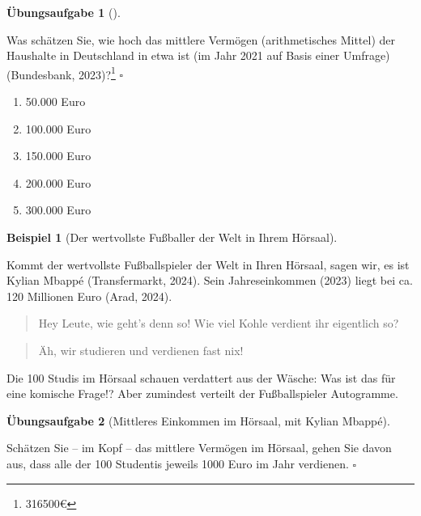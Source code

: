 \documentclass[
  letterpaper,
]{scrbook}
\providecommand{\tightlist}{%
  \setlength{\itemsep}{0pt}\setlength{\parskip}{0pt}}\usepackage{longtable,booktabs,array}
\theoremstyle{definition}
\newtheorem{exercise}{Übungsaufgabe}[chapter]
\theoremstyle{definition}
\newtheorem{example}{Beispiel}[chapter]
\theoremstyle{definition}
\theoremstyle{remark}
\begin{document}
\begin{exercise}[]\protect\hypertarget{exr-mw-wealth1}{}\label{exr-mw-wealth1}

Was schätzen Sie, wie hoch das mittlere Vermögen (arithmetisches Mittel)
der Haushalte in Deutschland in etwa ist (im Jahr 2021 auf Basis einer
Umfrage) (Bundesbank, 2023)?\footnote{316500€} \(\square\)

\begin{enumerate}
\def\labelenumi{\alph{enumi})}
\tightlist
\item
  50.000 Euro
\item
  100.000 Euro
\item
  150.000 Euro
\item
  200.000 Euro
\item
  300.000 Euro
\end{enumerate}

\end{exercise}

\begin{example}[Der wertvollste Fußballer der Welt in Ihrem
Hörsaal]\protect\hypertarget{exm-md}{}\label{exm-md}

Kommt der wertvollste Fußballspieler der Welt in Ihren Hörsaal, sagen
wir, es ist Kylian Mbappé (Transfermarkt, 2024). Sein Jahreseinkommen
(2023) liegt bei ca. 120 Millionen Euro (Arad, 2024).

\begin{quote}
{} Hey Leute, wie geht's denn so! Wie viel Kohle
verdient ihr eigentlich so?
\end{quote}

\begin{quote}
{} Äh, wir studieren und verdienen fast nix!
\end{quote}

Die 100 Studis im Hörsaal schauen verdattert aus der Wäsche: Was ist das
für eine komische Frage!? Aber zumindest verteilt der Fußballspieler
Autogramme.

\end{example}

\begin{exercise}[Mittleres Einkommen im Hörsaal, mit Kylian
Mbappé]\protect\hypertarget{exr-elon}{}\label{exr-elon}

Schätzen Sie -- im Kopf -- das mittlere Vermögen im Hörsaal, gehen Sie
davon aus, dass alle der 100 Studentis jeweils 1000 Euro im Jahr
verdienen. \(\square\)

\end{exercise}
\end{document}
